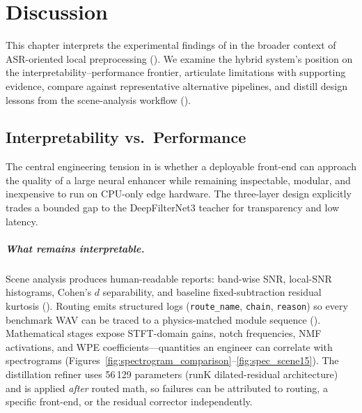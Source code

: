 \chapter{Discussion}
\label{ch:discussion}

This chapter interprets the experimental findings of  in the broader context of ASR-oriented local preprocessing (). We examine the hybrid system's position on the interpretability--performance frontier, articulate limitations with supporting evidence, compare against representative alternative pipelines, and distill design lessons from the scene-analysis workflow ().

\section{Interpretability vs.\ Performance}
\label{sec:interp_vs_perf}

The central engineering tension in \projectshort{} is whether a deployable front-end can approach the quality of a large neural enhancer while remaining inspectable, modular, and inexpensive to run on CPU-only edge hardware. The three-layer design explicitly trades a bounded gap to the DeepFilterNet3 teacher for transparency and low latency.

\paragraph{What remains interpretable.}
Scene analysis produces human-readable reports: band-wise SNR, local-SNR histograms, Cohen's $d$ separability, and baseline fixed-subtraction residual kurtosis (). Routing emits structured logs (\texttt{route\_name}, \texttt{chain}, \texttt{reason}) so every benchmark WAV can be traced to a physics-matched module sequence (). Mathematical stages expose STFT-domain gains, notch frequencies, NMF activations, and WPE coefficients---quantities an engineer can correlate with spectrograms (Figures~\ref{fig:spectrogram_comparison}--\ref{fig:spec_scene15}). The distillation refiner uses 56\,129 parameters (runK dilated-residual architecture) and is applied \emph{after} routed math, so failures can be attributed to routing, a specific front-end, or the residual corrector independently.

